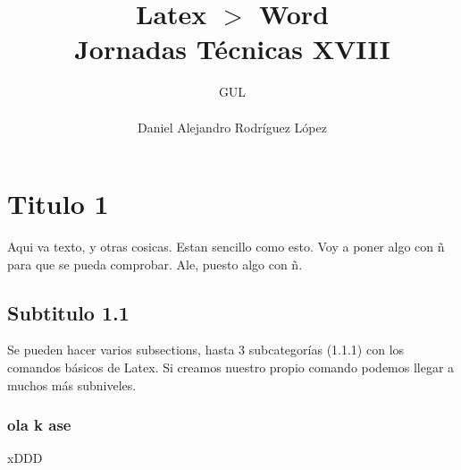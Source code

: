 \documentclass[10pt,a4paper,titlepage]{article} %
\title{ \textbf{ \Huge{Latex $>$ Word}} \\ Jornadas Técnicas XVIII}
\author{
		\begin{tabular}{l}
			\multicolumn{1}{l}{GUL} \\ \hline \\
			Daniel Alejandro Rodríguez López \\
		\end{tabular}
}
\begin{document}
\maketitle
\newpage

	\section{Titulo 1}
	Aqui va texto, y otras cosicas. Estan sencillo como esto. Voy a poner algo con ñ para que se pueda comprobar. Ale, puesto algo con ñ.

	\subsection{Subtitulo 1.1}
		Se pueden hacer varios subsections, hasta 3 subcategorías (1.1.1) con los comandos básicos de Latex. Si creamos nuestro propio comando podemos llegar a muchos más subniveles. 
		\subsubsection{ola k ase}
			xDDD
\end{document}
